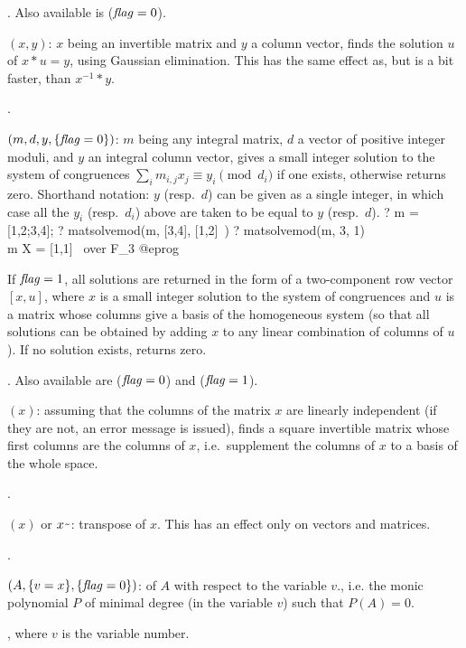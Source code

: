 . Also available is  ($\hbox{\it f\kern0pt lag\/}=0$).

$(x,y)$: $x$ being an invertible matrix and $y$ a column
vector, finds the solution $u$ of $x*u=y$, using Gaussian elimination. This
has the same effect as, but is a bit faster, than $x^{-1}*y$.

.

$(m,d,y,\{\hbox{\it f\kern0pt lag\/}=0\})$: $m$ being any integral matrix,
$d$ a vector of positive integer moduli, and $y$ an integral
column vector, gives a small integer solution to the system of congruences
$\sum_i m_{i,j}x_j\equiv y_i\pmod{d_i}$ if one exists, otherwise returns
zero. Shorthand notation: $y$ (resp.~$d$) can be given as a single integer,
in which case all the $y_i$ (resp.~$d_i$) above are taken to be equal to $y$
(resp.~$d$).
\bprog
  ? m = [1,2;3,4];
  ? matsolvemod(m, [3,4], [1,2]~)
  ? matsolvemod(m, 3, 1) \\ m X = [1,1]~ over F_3
@eprog

If $\hbox{\it f\kern0pt lag\/}=1$, all solutions are returned in the form of a two-component row
vector $[x,u]$, where $x$ is a small integer solution to the system of
congruences and $u$ is a matrix whose columns give a basis of the homogeneous
system (so that all solutions can be obtained by adding $x$ to any linear
combination of columns of $u$). If no solution exists, returns zero.

. Also available
are  ($\hbox{\it f\kern0pt lag\/}=0$)
and  ($\hbox{\it f\kern0pt lag\/}=1$).

$(x)$: assuming that the columns of the matrix $x$
are linearly independent (if they are not, an error message is issued), finds
a square invertible matrix whose first columns are the columns of $x$,
i.e.~supplement the columns of $x$ to a basis of the whole space.

.

$(x)$ or $x\til$: transpose of $x$.
This has an effect only on vectors and matrices.

.

$(A,\{v=x\},\{\hbox{\it f\kern0pt lag\/}=0\})$: 
of $A$ with respect to the variable $v$., i.e. the monic polynomial $P$
of minimal degree (in the variable $v$) such that $P(A) = 0$.

, where $v$ is the variable number. 

